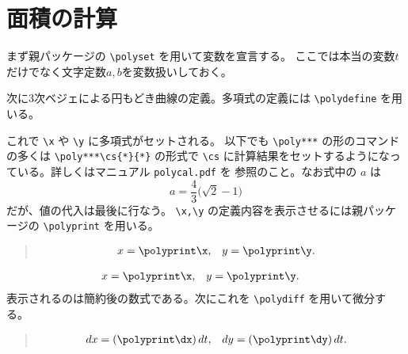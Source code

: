 \documentclass[dvipdfmx]{jsarticle}
\begin{document}
\section{面積の計算}
まず親パッケージの \verb|\polyset| を用いて変数を宣言する。
ここでは本当の変数$t$だけでなく文字定数$a,b$を変数扱いしておく。
\begin{quote}
\begin{boxedverbatim}
\end{boxedverbatim}
\end{quote}
次に3次ベジェによる円もどき曲線の定義。多項式の定義には \verb|\polydefine| を用いる。
\polydefine{}
\polydefine{}
\begin{quote}
\begin{boxedverbatim}
\polydefine{}
\polydefine{}
\end{boxedverbatim}
\end{quote}
これで \verb|\x| や \verb|\y| に多項式がセットされる。
以下でも \verb|\poly***| の形のコマンドの多くは  \verb|\poly***\cs{*}{*}| の形式で
\verb|\cs| に計算結果をセットするようになっている。詳しくはマニュアル \verb|polycal.pdf| を
参照のこと。なお式中の $a$ は
\[
  a=\frac43\bigl(\sqrt2-1\bigr)
\]
だが、値の代入は最後に行なう。
\verb+\x,\y+ の定義内容を表示させるには親パッケージの \verb+\polyprint+ を用いる。
\begin{quote}
\begin{boxedverbatim}
\begin{align*}
  x &= \polyprint\x, & y &= \polyprint\y.
\end{align*}    
\end{boxedverbatim}
\end{quote}
\begin{align*}
  x &= \polyprint\x, & y &= \polyprint\y.
\end{align*}
表示されるのは簡約後の数式である。次にこれを \verb|\polydiff| を用いて微分する。
\polydiff{}\x  \polydiff{}\y
\begin{quote}
\begin{boxedverbatim}
\polydiff{}\x  \polydiff{}\y
\begin{align*}
  dx &= (\polyprint\dx)\,dt, & dy &= (\polyprint\dy)\,dt.
\end{align*}    
\end{boxedverbatim}
\end{quote}
\end{document}
